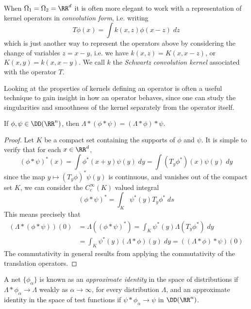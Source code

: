 \begin{remark}
    When $\Omega_1 = \Omega_2 = \RR^d$ it is often more elegant to work with a representation of kernel operators in \emph{convolution form}, i.e. writing
    \[ T \phi(x) = \int k(x,z) \phi(x-z)\; dz \]
    which is just another way to represent the operators above by considering the change of variables $z = x - y$, i.e. we have $k(x,z) = K(x,x-z)$, or $K(x,y) = k(x,x-y)$. We call $k$ the \emph{Schwartz convolution kernel} associated with the operator $T$. 
\end{remark}

Looking at the properties of kernels defining an operator is often a useful technique to gain insight in how an operator behaves, since one can study the singularities and smoothness of the kernel separately from the operator itself.

\begin{theorem}
    If $\phi, \psi \in \DD(\RR^n)$, then $\Lambda * (\phi * \psi) = (\Lambda * \phi) * \psi$.
\end{theorem}
\begin{proof}
  Let $K$ be a compact set containing the supports of $\phi$ and $\psi$. It is simple to verify that for each $x \in \RR^d$,
    \[ (\phi * \psi)^*(x) = \int \phi^*(x + y) \psi(y)\; dy = \int (T_y \phi^*)(x) \psi(y)\; dy \]
    since the map $y \mapsto (T_y \phi)^* \psi(y)$ is continuous, and vanishes out of the compact set $K$, we can consider the $C_c^\infty(K)$ valued integral
    \[ (\phi * \psi)^* = \int_K \psi^*(y) T_y \phi^*\; ds \]
    This means precisely that
    \begin{align*}
        (\Lambda * (\phi * \psi))(0) &= \Lambda((\phi * \psi)^*) = \int_K \psi^*(y) \Lambda(T_y \phi^*)\; dy\\
        &= \int_K \psi^*(y) (\Lambda * \phi)(y)\; dy = ((\Lambda * \phi) * \psi)(0)
    \end{align*}
    The commutativity in general results from applying the commutativity of the translation operators.
\end{proof}

A net $\{ \phi_\alpha \}$ is known as an {\it approximate identity} in the space of distributions if $\Lambda * \phi_\alpha \to \Lambda$ weakly as $\alpha \to \infty$, for every distribution $\Lambda$, and an approximate identity in the space of test functions if $\psi * \phi_\alpha \to \psi$ in $\DD(\RR^n)$.

